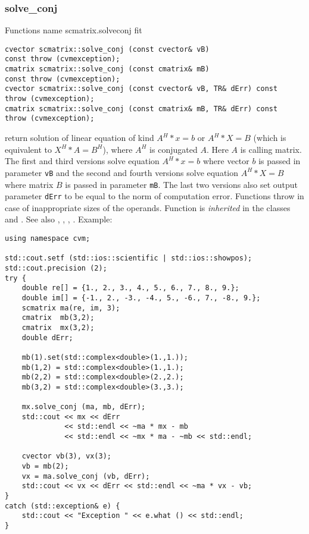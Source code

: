 \subsubsection{solve\_conj}
Functions%
\pdfdest name {scmatrix.solveconj} fit
\begin{verbatim}
cvector scmatrix::solve_conj (const cvector& vB)
const throw (cvmexception);
cmatrix scmatrix::solve_conj (const cmatrix& mB)
const throw (cvmexception);
cvector scmatrix::solve_conj (const cvector& vB, TR& dErr) const
throw (cvmexception);
cmatrix scmatrix::solve_conj (const cmatrix& mB, TR& dErr) const
throw (cvmexception);
\end{verbatim}
return  solution of  linear equation of kind $A^H*x=b$ or $A^H*X=B$
(which is equivalent to $X^H*A=B^H$), where $A^H$ is conjugated $A$.
Here $A$ is calling matrix. The first and third versions
solve  equation $A^H*x=b$ where vector $b$ is passed in 
 parameter \verb"vB"
and the second and fourth versions
solve equation $A^H*X=B$ where matrix $B$ is passed 
in parameter \verb"mB".
The last two versions also set output parameter \verb"dErr" to be equal
to the norm of computation error.
Functions throw 
in case of inappropriate sizes of the operands.
Function is \emph{inherited} in the classes
and .
See also
,
,
,
.
Example:
\begin{Verbatim}
using namespace cvm;

std::cout.setf (std::ios::scientific | std::ios::showpos);
std::cout.precision (2);
try {
    double re[] = {1., 2., 3., 4., 5., 6., 7., 8., 9.};
    double im[] = {-1., 2., -3., -4., 5., -6., 7., -8., 9.};
    scmatrix ma(re, im, 3);
    cmatrix  mb(3,2);
    cmatrix  mx(3,2);
    double dErr;

    mb(1).set(std::complex<double>(1.,1.));
    mb(1,2) = std::complex<double>(1.,1.);
    mb(2,2) = std::complex<double>(2.,2.);
    mb(3,2) = std::complex<double>(3.,3.);

    mx.solve_conj (ma, mb, dErr);
    std::cout << mx << dErr 
              << std::endl << ~ma * mx - mb
              << std::endl << ~mx * ma - ~mb << std::endl;

    cvector vb(3), vx(3);
    vb = mb(2);
    vx = ma.solve_conj (vb, dErr);
    std::cout << vx << dErr << std::endl << ~ma * vx - vb;
}
catch (std::exception& e) {
    std::cout << "Exception " << e.what () << std::endl;
}
\end{Verbatim}
